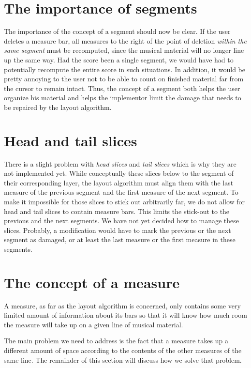 \documentclass[11pt]{book}
\begin{document}
\section{The importance of segments}

The importance of the concept of a segment should now be clear.
If the user deletes a measure bar, all measures to the right of the
point of deletion \emph{within the same segment} must be recomputed,
since the musical material will no longer line up the same way.  Had
the score been a single segment, we would have had to potentially
recompute the entire score in such situations.  In addition, it would
be pretty annoying to the user not to be able to count on finished
material far from the cursor to remain intact.  Thus, the concept of a
segment both helps the user organize his material and helps the
implementor limit the damage that needs to be repaired by the layout
algorithm. 

\section{Head and tail slices}

There is a slight problem with \emph{head slices} and \emph{tail
slices} which is why they are not implemented yet.  While
conceptually these slices below to the segment of their
corresponding layer, the layout algorithm must align them with the
last measure of the previous segment and the first measure of the
next segment.  To make it impossible for those slices to stick out
arbitrarily far, we do not allow for head and tail slices to contain
measure bars.  This limits the stick-out to the previous and the
next segments.  We have not yet decided how to manage these slices.
Probably, a modification would have to mark the previous or the next
segment as damaged, or at least the last measure or the first measure
in these segments.  

\section{The concept of a measure}

A measure, as far as the layout algorithm is concerned, only contains
some very limited amount of information about its bars so that it will
know how much room the measure will take up on a given line of musical
material. 

The main problem we need to address is the fact that a measure takes
up a different amount of space according to the contents of the other
measures of the same line.  The remainder of this section will discuss
how we solve that problem.
\end{document}
